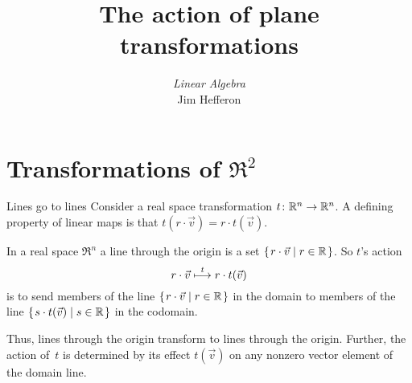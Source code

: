 \documentclass[10pt,t]{beamer}
\title[Plane transformations] %
{The action of plane transformations}
\author{\textit{Linear Algebra} \\ {\small Jim Hef{}feron}}
\institute{
  \texttt{http://joshua.smcvt.edu/linearalgebra}
}
\date{}
\begin{document}
\begin{frame}
  \titlepage
\end{frame}




\section{Transformations of $\Re^2$}
\begin{frame}{Lines go to lines}
Consider a real space transformation
$\mbox{$t\colon \mathbb{R}^n\to \mathbb{R}^n$}$.
A defining property of linear maps is that 
$t(r\cdot\vec{v})=r\cdot t(\vec{v})$.

In a real space $\Re^n$ a line through the origin is a set 
$\mbox{$\{\hspace{0.1em}r\cdot \vec{v}\mid r\in\mathbb{R}\hspace{0.1em}\}$}$. 
So $t$'s action 
\begin{equation*}
  r\cdot\vec{v}\stackrel{t}{\longmapsto} r\cdot t(\vec{v})
\end{equation*}
is to send members of the line $\mbox{$\{\hspace{0.1em}r\cdot \vec{v}\mid r\in\mathbb{R}\hspace{0.1em}\}$}$
in the domain to members of the line
$\mbox{$\{\hspace{0.1em}s\cdot t(\vec{v})\mid s\in\mathbb{R}\hspace{0.1em}\}$}$
in the codomain. 

Thus, lines through the origin 
transform to lines through the origin.
Further, the action of~$t$ is determined by its effect $t(\vec{v})$
on any
nonzero vector element of the domain line.
\end{frame}
\end{document}
